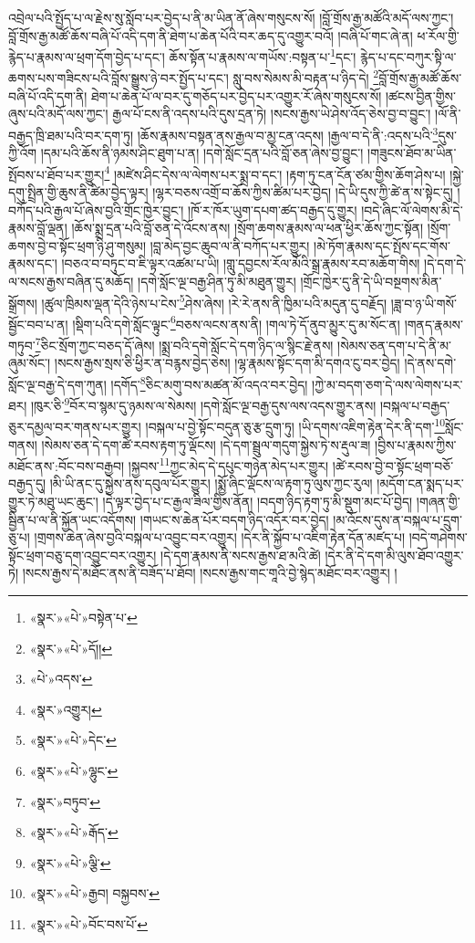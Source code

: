 འབྲེལ་པའི་སྤྱོད་པ་ལ་རྗེས་སུ་སློབ་པར་བྱེད་པ་ནི་མ་ཡིན་ནོ་ཞེས་གསུངས་སོ། །བློ་གྲོས་རྒྱ་མཚོའི་མདོ་ལས་ཀྱང་། བློ་གྲོས་རྒྱ་མཚོ་ཆོས་བཞི་པོ་འདི་དག་ནི་ཐེག་པ་ཆེན་པོའི་བར་ཆད་དུ་འགྱུར་བའོ། །བཞི་པོ་གང་ཞེ་ན། ཕ་རོལ་གྱི་རྙེད་པ་རྣམས་ལ་ཕྲག་དོག་བྱེད་པ་དང་། ཆོས་སྟོན་པ་རྣམས་ལ་གཡོས་:བསྟན་པ་\footnote{«སྣར་»«པེ་»བསྟེན་པ་}དང་། རྙེད་པ་དང་བཀུར་སྟི་ལ་ཆགས་པས་གཟིངས་པའི་བློས་སྒྱུས་ཉེ་བར་སྤྱོད་པ་དང་། སླུ་བས་སེམས་མི་བརྟན་པ་ཉིད་དེ། \footnote{«སྣར་»«པེ་»དོ།། }བློ་གྲོས་རྒྱ་མཚོ་ཆོས་བཞི་པོ་འདི་དག་ནི། ཐེག་པ་ཆེན་པོ་ལ་བར་དུ་གཅོད་པར་བྱེད་པར་འགྱུར་རོ་ཞེས་གསུངས་སོ། །ཚངས་བྱིན་གྱིས་ཞུས་པའི་མདོ་ལས་ཀྱང་། རྒྱལ་པོ་ངས་ནི་འདས་པའི་དུས་དྲན་ཏེ། །སངས་རྒྱས་ཡེ་ཤེས་འོད་ཅེས་བྱ་བ་བྱུང་། །ལོ་ནི་བརྒྱད་ཁྲི་ཐམ་པའི་བར་དག་ཏུ། །ཆོས་རྣམས་བསྟན་ནས་རྒྱལ་བ་མྱ་ངན་འདས། །རྒྱལ་བ་དེ་ནི་:འདས་པའི་\footnote{«པེ་»འདས་}དུས་ཀྱི་འོག །དམ་པའི་ཆོས་ནི་ཉམས་ཤིང་ཐུག་པ་ན། །དགེ་སློང་དྲན་པའི་བློ་ཅན་ཞེས་བྱ་བྱུང་། །གཟུངས་ཐོབ་མ་ཡིན་སྤོབས་པ་ཐོབ་པར་གྱུར།\footnote{«སྣར་»འགྱུར།} །མཛེས་ཤིང་དེས་ལ་ལེགས་པར་སྨྲ་བ་དང་། །རྟག་ཏུ་ངན་ངོན་ཙམ་གྱིས་ཆོག་ཤེས་པ། །སྐྱེ་དགུ་སྤྲིན་གྱི་ཆུས་ནི་ཚིམ་བྱེད་ལྟར། །ལྷར་བཅས་འགྲོ་བ་ཆོས་ཀྱིས་ཚིམ་པར་བྱེད། །དེ་ཡི་དུས་ཀྱི་ཚེ་ན་ས་སྟེང་དུ། །
བཀོད་པའི་རྒྱལ་པོ་ཞེས་བྱའི་གྲོང་ཁྱེར་བྱུང་། །ཁོ་ར་ཁོར་ཡུག་དཔག་ཚད་བརྒྱད་དུ་གྱུར། །བདེ་ཞིང་ལོ་ལེགས་མི་དེ་རྣམས་བློ་ལྡན། །ཆོས་སྨྲ་དྲན་པའི་བློ་ཅན་དེ་འོངས་ནས། །སྲོག་ཆགས་རྣམས་ལ་ཕན་ཕྱིར་ཆོས་ཀྱང་སྟོན། །སྲོག་ཆགས་བྱེ་བ་སྟོང་ཕྲག་ཉི་ཤུ་གསུམ། །བླ་མེད་བྱང་ཆུབ་ལ་ནི་བཀོད་པར་གྱུར། །མེ་ཏོག་རྣམས་དང་སྤོས་དང་གོས་རྣམས་དང་། །བཅའ་བ་བཏུང་བ་ཇི་ལྟར་འཚམ་པ་ཡི། །གླུ་དབྱངས་རོལ་མོའི་སྒྲ་རྣམས་རབ་མཆོག་གིས། །དེ་དག་དེ་ལ་སངས་རྒྱས་བཞིན་དུ་མཆོད། །དགེ་སློང་ལྔ་བརྒྱ་ཤིན་ཏུ་མི་མཐུན་གྱུར། །གྲོང་ཁྱེར་དུ་ནི་དེ་ཡི་བསྔགས་མིན་སྒྲོགས། །ཚུལ་ཁྲིམས་ལྡན་དེའི་ཉེས་པ་ངེས་\footnote{«སྣར་»«པེ་»དེང་}ཤེས་ཞེས། །རེ་རེ་ནས་ནི་ཁྱིམ་པའི་མདུན་དུ་བརྗོད། །ཟླ་བ་ཉ་ཡི་གསོ་སྦྱོང་བབ་པ་ན། །སྡིག་པའི་དགེ་སློང་ལྟུང་\footnote{«སྣར་»«པེ་»ལྷུང་}བཅས་ལངས་ནས་ནི། །གལ་ཏེ་དོ་ནུབ་མྱུར་དུ་མ་སོང་ན། །གནད་རྣམས་གཏུབ་\footnote{«སྣར་»བཏུབ་}ཅིང་སྲོག་ཀྱང་བཅད་དོ་ཞེས། །སྨྲ་བའི་དགེ་སློང་དེ་དག་ཉིད་ལ་སྙིང་རྗེ་ནས། །སེམས་ཅན་དག་པ་དེ་ནི་མ་ཞུམ་སོང་། །སངས་རྒྱས་སྲས་ཅི་ཕྱིར་ན་བརྙས་བྱེད་ཅེས། །ལྷ་རྣམས་སྟོང་དག་མི་དགའ་ངུ་བར་བྱེད། །དེ་ནས་དགེ་སློང་ལྔ་བརྒྱ་དེ་དག་ཀུན། །དགོད་\footnote{«སྣར་»«པེ་»རྒོད་}ཅིང་མགུ་བས་མཚན་མོ་འདའ་བར་བྱེད། །ཀྱེ་མ་བདག་ཅག་དེ་ལས་ལེགས་པར་ཐར། །ཁུར་ཅི་\footnote{«སྣར་»«པེ་»ལྕི་}བོར་བ་སྙམ་དུ་ཉམས་ལ་སེམས། །དགེ་སློང་ལྔ་བརྒྱ་དུས་ལས་འདས་གྱུར་ནས། །བསྐལ་པ་བརྒྱད་ཅུར་དམྱལ་བར་གནས་པར་གྱུར། །བསྐལ་པ་བྱེ་སྟོང་བདུན་ཅུ་རྩ་དྲུག་ཏུ། །ཡི་དགས་འཇིག་རྟེན་དེར་ནི་དག་\footnote{«སྣར་»«པེ་»རྒྱབ། བསྐྱབས་}སློང་གནས། །སེམས་ཅན་དེ་དག་ཚེ་རབས་རྟག་ཏུ་ལྡོངས། །དེ་དག་སྦྲུལ་གདུག་སྐྱེས་ཏེ་ས་རྡུལ་ཟ། །བྱིས་པ་རྣམས་ཀྱིས་མཐོང་ནས་:བོང་བས་བརྒྱབ། །སྐྱབས་\footnote{«སྣར་»«པེ་»བོང་བས་པོ་}ཀྱང་མེད་དེ་དཔུང་གཉེན་མེད་པར་གྱུར། །ཚེ་རབས་བྱེ་བ་སྟོང་ཕྲག་བཅོ་བརྒྱད་དུ། །མི་ཡི་ནང་དུ་སྐྱེས་ནས་དབུལ་པོར་གྱུར། །སྨྱོ་ཞིང་ལྡོངས་ལ་རྟག་ཏུ་ལུས་ཀྱང་རུལ། །མདོག་ངན་སྨད་པར་གྱུར་ཏེ་མཐུ་ཡང་ཆུང་། །དེ་ལྟར་བྱེད་པ་ང་རྒྱལ་ཟིལ་གྱིས་ནོན། །བདག་ཉིད་རྟག་ཏུ་མི་སྡུག་མང་པོ་བྱེད། །གཞན་གྱི་སྦྱིན་པ་ལ་ནི་སྐྱོན་ཡང་འདོགས། །གཡང་ས་ཆེན་པོར་བདག་ཉིད་འདོར་བར་བྱེད། །མ་འོངས་དུས་ན་བསྐལ་པ་དྲུག་ཅུ་པ། །གྲགས་ཆེན་ཞེས་བྱའི་བསྐལ་པ་འབྱུང་བར་འགྱུར། །དེར་ནི་སྐྱོབ་པ་འཇིག་རྟེན་དོན་མཛད་པ། །བདེ་གཤེགས་སྟོང་ཕྲག་བཅུ་དག་འབྱུང་བར་འགྱུར། །དེ་དག་རྣམས་ནི་སངས་རྒྱས་ཐ་མའི་ཚེ། །དེར་ནི་དེ་དག་མི་ལུས་ཐོབ་འགྱུར་ཏེ། །སངས་རྒྱས་དེ་མཐོང་ནས་ནི་བཟོད་པ་ཐོབ། །སངས་རྒྱས་གང་གཱའི་བྱེ་སྙེད་མཐོང་བར་འགྱུར། །
